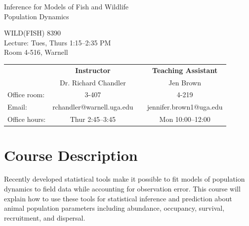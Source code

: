 \documentclass[12pt]{article}
\begin{document}
{\centering

{\Large \sc
  Inference for Models of Fish and Wildlife \\ Population Dynamics  
}
\vspace{6pt}

WILD(FISH) 8390  \\
Lecture: Tues, Thurs 1:15--2:35 PM \\
Room 4-516, Warnell \\


\normalsize

\vspace{12pt}

\begin{tabular}[h!]{lccc}
                     & \textbf{Instructor}       & \hspace{0.01cm} & \textbf{Teaching Assistant} \\
                     & Dr. Richard Chandler      &                 & Jen Brown                \\
Office room:         & 3-407                     &                 & 4-219                       \\
Email:               & rchandler@warnell.uga.edu &                 & jennifer.brown1@uga.edu       \\
Office hours:        & Thur 2:45--3:45           &                 & Mon 10:00--12:00             \\
\end{tabular}


}



\normalsize


\vspace{-2mm}
\section*{\normalsize Course Description}
\vspace{-4mm}
Recently developed statistical tools make it possible to fit models of
population dynamics to field data while accounting for observation
error. This course will explain how to use these tools for statistical
inference and prediction about animal population parameters including
abundance, occupancy, survival, recruitment, and dispersal.   
\end{document}
